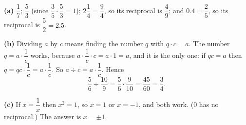 \textbf{(a)} $\dfrac17$; $\dfrac53$ (since $\dfrac35\cdot\dfrac53=1$); $2\dfrac14=\dfrac94$, so its reciprocal is $\dfrac49$; and $0.4=\dfrac25$, so its reciprocal is $\dfrac52=2.5$.

\textbf{(b)} Dividing $a$ by $c$ means finding the number $q$ with $q\cdot c=a$. The number $q=a\cdot\dfrac1c$ works, because $a\cdot\dfrac1c\cdot c=a\cdot1=a$, and it is the only one: if $qc=a$ then $q=qc\cdot\dfrac1c=a\cdot\dfrac1c$. So $a\div c=a\cdot\dfrac1c$. Hence
\[\dfrac56\div\dfrac{10}9=\dfrac56\cdot\dfrac9{10}=\dfrac{45}{60}=\boxed{\dfrac34}.\]

\textbf{(c)} If $x=\dfrac1x$ then $x^2=1$, so $x=1$ or $x=-1$, and both work. ($0$ has no reciprocal.) The answer is $\boxed{x=\pm1}$.
